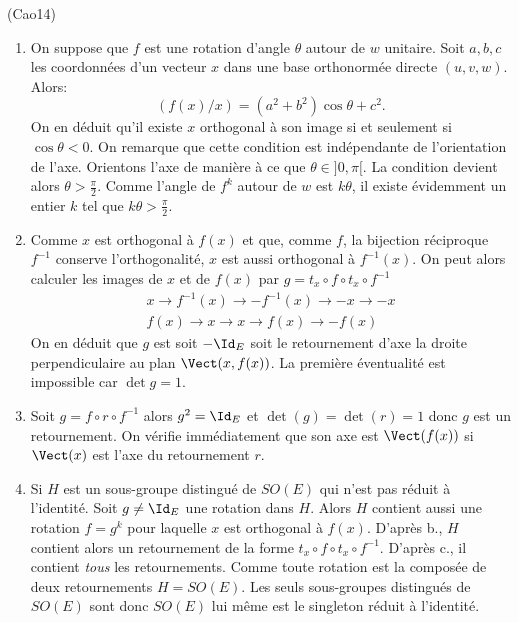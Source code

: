 \begin{tiny}(Cao14)\end{tiny} 
\begin{enumerate}
 \item On suppose que $f$ est une rotation d'angle $\theta$ autour de $w$ unitaire. Soit $a,b,c$ les coordonnées d'un vecteur $x$ dans une base orthonormée directe $(u,v,w)$. Alors:
\begin{displaymath}
 (f(x)/x)=(a^2+b^2)\cos \theta + c^2 .
\end{displaymath}
On en déduit qu'il existe $x$ orthogonal à son image si et seulement si $\cos \theta <0$. On remarque que cette condition est indépendante de l'orientation de l'axe. Orientons l'axe de manière à ce que $\theta\in]0,\pi[$. La condition devient alors $\theta>\frac{\pi}{2}$. Comme l'angle de $f^k$ autour de $w$ est $k\theta$, il existe évidemment un entier $k$ tel que $k\theta>\frac{\pi}{2}$.
 \item Comme $x$ est orthogonal à $f(x)$ et que, comme $f$, la bijection réciproque  $f^{-1}$ conserve l'orthogonalité, $x$ est aussi orthogonal à $f^{-1}(x)$. On peut alors calculer les images de $x$ et de $f(x)$ par $g=t_x\circ f \circ t_x \circ f^{-1}$
\begin{align*}
 &x    \rightarrow f^{-1}(x) \rightarrow -f^{-1}(x) \rightarrow -x   \rightarrow -x\\
 &f(x) \rightarrow x   \rightarrow x   \rightarrow f(x) \rightarrow -f(x)&
\end{align*}
On en déduit que $g$ est soit $-\Id_E$ soit le retournement d'axe la droite perpendiculaire au plan $\Vect(x,f(x))$. La première éventualité est impossible car $\det g =1$.
 \item Soit $g=f\circ r \circ f^{-1}$ alors $g^2=\Id_E$ et $\det(g)=\det(r)=1$ donc $g$ est un retournement. On vérifie immédiatement que son axe est $\Vect(f(x))$ si $\Vect(x)$ est l'axe du retournement $r$.
 \item Si $H$ est un sous-groupe distingué de $SO(E)$ qui n'est pas réduit à l'identité. Soit $g\neq \Id_E$ une rotation dans $H$. Alors $H$ contient aussi une rotation $f=g^k$ pour laquelle $x$ est orthogonal à $f(x)$. D'après b., $H$ contient alors un retournement de la forme $t_x\circ f \circ t_x \circ f^{-1}$. D'après c., il contient \emph{tous} les retournements. Comme toute rotation est la composée de deux retournements $H=SO(E)$. Les seuls sous-groupes distingués de $SO(E)$ sont donc $SO(E)$ lui même est le singleton réduit à l'identité.  
\end{enumerate}
